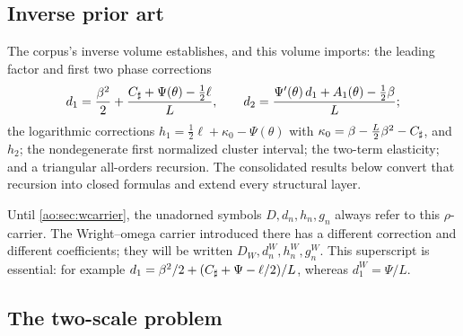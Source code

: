 \subsection{Inverse prior art}

The corpus's inverse volume establishes, and this volume imports: the
leading factor and first two phase corrections
\begin{equation}
 d_1=\frac{\beta^{2}}2
 +\frac{C_{\sharp}+\Psi(\theta)-\tfrac12\ell}{L},
 \qquad
 d_2=\frac{\Psi'(\theta)\,d_1+A_1(\theta)-\tfrac12\beta}{L};
 \label{ao:eq:d1-d2}
\end{equation}
the logarithmic corrections
$h_1=\tfrac12\ell+\kappa_0-\Psi(\theta)$ with
$\kappa_0=\beta-\tfrac L2\beta^{2}-C_{\sharp}$, and $h_2$; the
nondegenerate first normalized cluster interval; the two-term
elasticity; and a triangular all-orders recursion.  The consolidated
results below convert that recursion into closed formulas and extend
every structural layer.

Until \cref{ao:sec:wcarrier}, the unadorned symbols $D,d_n,h_n,g_n$
always refer to this $\rho$-carrier.  The Wright--omega carrier introduced
there has a different correction and different coefficients; they will be
written $D_W,d_n^W,h_n^W,g_n^W$.  This superscript is essential: for example
$d_1=\beta^2/2+(C_{\sharp}+\Psi-\ell/2)/L$, whereas $d_1^W=\Psi/L$.

\subsection{The two-scale problem}

